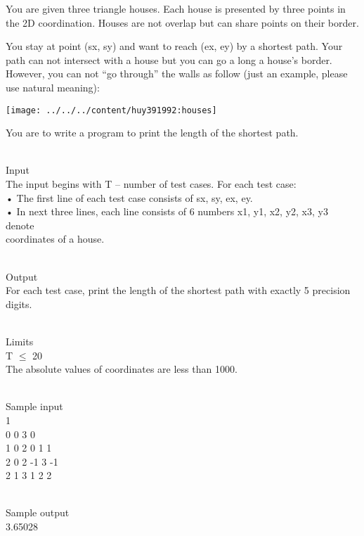 



   You are given three triangle houses. Each house is presented by three points in the 2D coordination. Houses are not overlap but can share points on their border.  

   You stay at point (sx, sy) and want to reach (ex, ey) by a shortest path. Your path can not intersect with a house but you can go a long a house’s border. However, you can not “go through” the walls as follow (just an example, please use natural meaning):  


\texttt{[image: ../../../content/huy391992:houses]}

   You are to write a program to print the length of the shortest path.  


\\   Input   
\\   The input begins with T – number of test cases. For each test case:   
\\   • The first line of each test case consists of sx, sy, ex, ey.   
\\   • In next three lines, each line consists of 6 numbers x1, y1, x2, y2, x3, y3 denote   
\\   coordinates of a house.  


\\   Output   
\\   For each test case, print the length of the shortest path with exactly 5 precision digits.  


\\   Limits   
\\   T  $\le$  20   
\\   The absolute values of coordinates are less than 1000.  


\\   Sample input   
\\   1   
\\   0 0 3 0   
\\   1 0 2 0 1 1   
\\   2 0 2 -1 3 -1   
\\   2 1 3 1 2 2  


\\   Sample output   
\\   3.65028  

